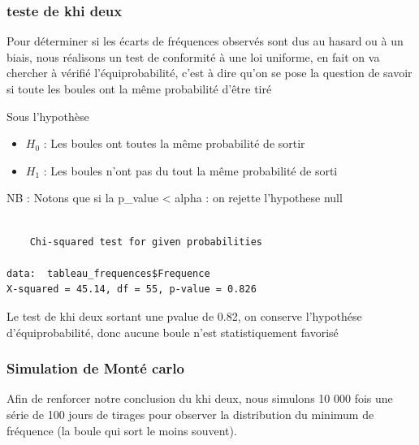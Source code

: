\documentclass{article}
\newenvironment{Shaded}{\begin{snugshade}}{\end{snugshade}}
\newcommand{\FunctionTok}[1]{\textcolor[rgb]{0.28,0.35,0.67}{#1}}
\newcommand{\NormalTok}[1]{\textcolor[rgb]{0.00,0.23,0.31}{#1}}
\newcommand{\SpecialCharTok}[1]{\textcolor[rgb]{0.37,0.37,0.37}{#1}}
\begin{document}
\subsubsection{teste de khi deux}\label{teste-de-khi-deux}

Pour déterminer si les écarts de fréquences observés sont dus au hasard
ou à un biais, nous réalisons un test de conformité à une loi uniforme,
en fait on va chercher à vérifié l'équiprobabilité, c'est à dire qu'on
se pose la question de savoir si toute les boules ont la même
probabilité d'être tiré

Sous l'hypothèse

\begin{itemize}
      \item $H_0$ : Les boules ont toutes la même probabilité de sortir 
      \item $H_1$ : Les boules n'ont pas du tout la même probabilité de sorti
\end{itemize}

NB : Notons que si la p\_value \textless{} alpha : on rejette
l'hypothese null

\begin{Shaded}
\end{Shaded}

\begin{verbatim}

    Chi-squared test for given probabilities

data:  tableau_frequences$Frequence
X-squared = 45.14, df = 55, p-value = 0.826
\end{verbatim}

Le test de khi deux sortant une pvalue de 0.82, on conserve l'hypothése
d'équiprobabilité, donc aucune boule n'est statistiquement favorisé

\subsubsection{Simulation de Monté
carlo}\label{simulation-de-montuxe9-carlo}

Afin de renforcer notre conclusion du khi deux, nous simulons 10 000
fois une série de 100 jours de tirages pour observer la distribution du
minimum de fréquence (la boule qui sort le moins souvent).
\end{document}
